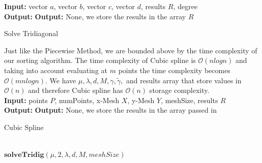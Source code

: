 \documentclass[12pt]{article}
\theoremstyle{remark}
\begin{document}
\textbf{Input: } vector $a$, vector $b$, vector $c$, vector $d$, results $R$, degree \\
\textbf{Output: } \textbf{Output:} None, we store the results in the array $R$
\begin{algorithm}[H]
	\caption{Solve Tridiagonal}
	\begin{algorithmic}[1]	
		\EndFor
		\EndFor
		\EndFor
	\end{algorithmic}
\end{algorithm}

Just like the Piecewise Method, we are bounded above by the time complexity of our sorting algorithm. The time complexity of Cubic spline is $\mathcal{O}(nlogn)$ and taking into account evaluating at $m$ points the time complexity becomes $\mathcal{O}(mnlogn)$. We have $\mu, \lambda, d, M, \gamma,\tilde{\gamma}, $ and results array that store values in $\mathcal{O}(n)$ and therefore Cubic spline has $\mathcal{O}(n)$ storage complexity. \\

\textbf{Input: } points $P$, numPoints, x-Mesh $X$, y-Mesh $Y$, meshSize, results $R$ \\
\textbf{Output: } \textbf{Output:} None, we store the results in the array passed in
\begin{algorithm}[H]
	\caption{Cubic Spline}
	\begin{algorithmic}[1]	
		\EndFor
		\EndIf \\
		\textbf{$\textbf{solveTridig}(\mu, 2, \lambda, d, M, meshSize)$}
		\EndFor
		\EndIf
		\EndFor
		\EndFor
	\end{algorithmic}
\end{algorithm}
\end{document}

